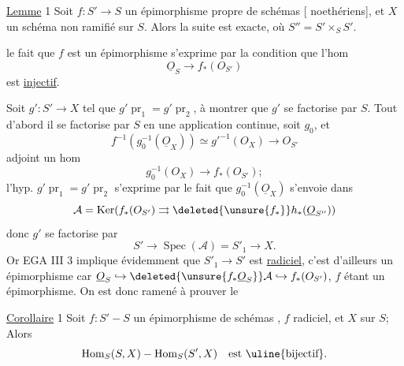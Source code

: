 \uline{Lemme} 1 Soit $f:S'\longrightarrow S$ un épimorphisme propre de schémas [ noethériens], et  $X$ un schéma  non ramifié sur $S$. Alors la suite
est exacte, où $S''=S'\times_S S'$.

 le fait que $f$ est un épimorphisme s'exprime par la condition que l'hom
\[
\underline O_S\longrightarrow f_*(O_{S'})
\]
est \uline{injectif}.

Soit $g':S'\longrightarrow X$ tel que $g'\operatorname{pr}_1=g'\operatorname{pr}_2$, à montrer que $g'$ se factorise par $S$. Tout d'abord il se factorise par $S$ en  une application continue, soit $g_0$, et
\[
f^{-1}(g_0^{-1}(\underline O_X))\simeq g'^{-1}(O_X)\longrightarrow O_{S'}
\]
adjoint un hom
\[
g_0^{-1}(O_X)\longrightarrow f_*(O_{S'});
\]
l'hyp. $g'\operatorname{pr}_1=g'\operatorname{pr}_2$ s'exprime par le fait que $g_0^{-1}(\underline O_X)$ s'envoie dans
\[
\mathcal A=\operatorname{Ker}(f_*(O_{S'})\rightrightarrows\deleted{\unsure{f_*}}h_*(\underline O_{S''}))
\]
donc $g'$ se factorise par
\[
S'\longrightarrow\operatorname{Spec}(\mathcal A)=S'_1\longrightarrow X.
\]
Or EGA III 3 implique évidemment que $S'_1\longrightarrow S'$ est  \uline{radiciel}, c'est d'ailleurs un épimorphisme car $\underline O_S\hookrightarrow\deleted{\unsure{f_*\underline O_S}}\mathcal A\hookrightarrow f_*(O_{S'})$, $f$ étant un épimorphisme. On est donc ramené à prouver le

\uline{Corollaire} 1 Soit $f:S'\mathbin{-}S$ un épimorphisme de schémas , $f$   radiciel, et $X$   sur $S$;   Alors
\[
\operatorname{Hom}_S(S,X)\mathbin{-}\operatorname{Hom}_S(S',X)\quad\text{est \uline{bijectif}}.
\]
